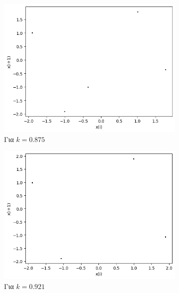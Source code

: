 \begin{figure}[ht]
\begin{subfigure}[b]{0.4\textwidth}
		\includegraphics[width=\textwidth]{LateX images/graphs q19/g11}
		\caption{Για $k=0.875$}
		\label{f:k100}
	\end{subfigure}
	\hfill
	\begin{subfigure}[b]{0.4\textwidth}
		\centering
		\includegraphics[width=\textwidth]{LateX images/graphs q19/g12}
		\caption{Για $k=0.921$}
		\label{f:k101}
	\end{subfigure}
	\hfill
	\begin{subfigure}[b]{0.4\textwidth}
		\centering

\end{subfigure}
\end{figure}
